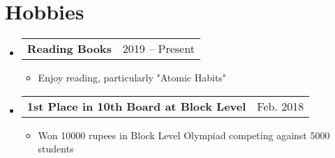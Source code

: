 \documentclass[letterpaper,10pt]{article}
\makeatletter
\newcommand{\resumeItem}[1]{
  \item\small{
    {#1 \vspace{-2pt}}
  }
}
\newcommand{\resumeProjectHeading}[2]{
    \item
    \begin{tabular*}{0.97\textwidth}{l@{\extracolsep{\fill}}r}
      \small#1 & #2 \\
    \end{tabular*}\vspace{-7pt}
}
\newcommand{\resumeSubHeadingListStart}{\begin{itemize}[leftmargin=0.15in, label={}]}
\newcommand{\resumeSubHeadingListEnd}{\end{itemize}}
\newcommand{\resumeItemListStart}{\begin{itemize}}
\newcommand{\resumeItemListEnd}{\end{itemize}\vspace{-5pt}}
\makeatother
\begin{document}
\section{Hobbies}
    \resumeSubHeadingListStart
        \resumeProjectHeading
        {\textbf{Reading Books}}{2019 -- Present}
        \resumeItemListStart
            \resumeItem{Enjoy reading, particularly "Atomic Habits"}
        \resumeItemListEnd

        \resumeProjectHeading
        {\textbf{1st Place in 10th Board at Block Level}}{Feb. 2018}
        \resumeItemListStart
            \resumeItem{Won 10000 rupees in Block Level Olympiad competing against 5000 students}
        \resumeItemListEnd
    \resumeSubHeadingListEnd 
\end{document}

